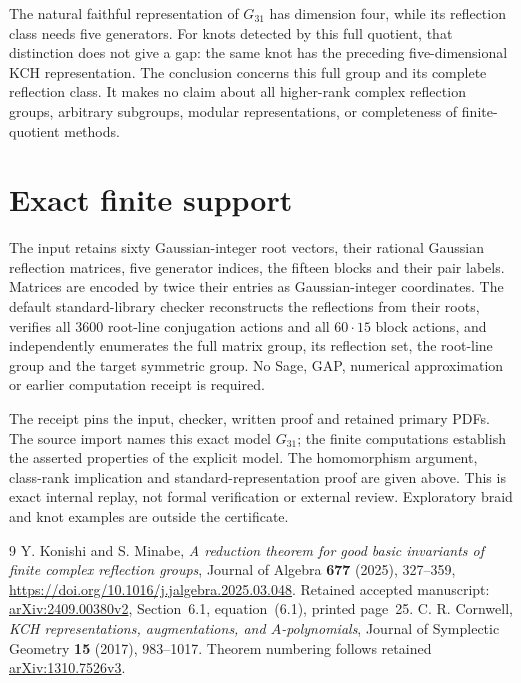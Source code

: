 \documentclass[11pt]{article}
\begin{document}
The natural faithful representation of $G_{31}$ has dimension four,
while its reflection class needs five generators. For knots detected
by this full quotient, that distinction does not give a gap:
the same knot has the preceding five-dimensional KCH representation.
The conclusion concerns this full group and its complete reflection
class. It makes no claim about all higher-rank complex reflection
groups, arbitrary subgroups, modular representations, or completeness
of finite-quotient methods.

\section*{Exact finite support}
The input retains sixty Gaussian-integer root vectors, their rational
Gaussian reflection matrices, five generator indices, the fifteen
blocks and their pair labels. Matrices are encoded by twice their
entries as Gaussian-integer coordinates. The default standard-library
checker reconstructs the reflections from their roots, verifies all
3600 root-line conjugation actions and all $60\cdot15$ block actions,
and independently enumerates the full matrix group, its reflection
set, the root-line group and the target symmetric group.
No Sage, GAP, numerical approximation or earlier computation receipt
is required.

The receipt pins the input, checker, written proof and retained
primary PDFs. The source import names this exact model $G_{31}$;
the finite computations establish the asserted properties of the
explicit model. The homomorphism argument, class-rank implication and
standard-representation proof are given above. This is exact internal
replay, not formal verification or external review. Exploratory braid
and knot examples are outside the certificate.

\begin{thebibliography}{9}
Y. Konishi and S. Minabe,
\emph{A reduction theorem for good basic invariants of finite complex
reflection groups},
Journal of Algebra \textbf{677} (2025), 327--359,
\url{https://doi.org/10.1016/j.jalgebra.2025.03.048}.
Retained accepted manuscript:
\href{https://arxiv.org/abs/2409.00380v2}{arXiv:2409.00380v2},
Section~6.1, equation~(6.1), printed page~25.
C. R. Cornwell, \emph{KCH representations, augmentations, and
$A$-polynomials},
Journal of Symplectic Geometry \textbf{15} (2017), 983--1017.
Theorem numbering follows retained
\href{https://arxiv.org/abs/1310.7526v3}{arXiv:1310.7526v3}.
\end{thebibliography}
\end{document}

